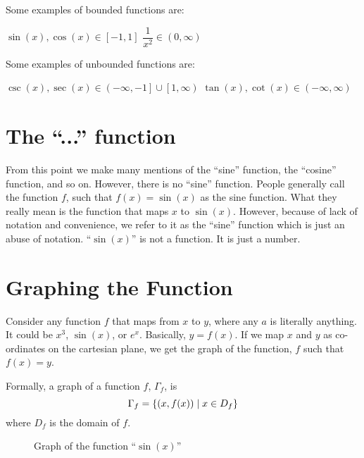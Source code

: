 \begin{example}
    Some examples of bounded functions are:
    \begin{enumerate}
        \ii \(\sin(x), \cos(x) \in \left[-1,1\right]\)
        \ii \(\dfrac{1}{x^2} \in \left(0,\infty\right)\)
    \end{enumerate}
\end{example}

\begin{example}
    Some examples of unbounded functions are:
    \begin{enumerate}
        \ii \(\csc(x), \sec(x) \in \left(-\infty, -1\right] \cup \left[1, \infty\right)\)
        \ii \(\tan(x), \cot(x) \in \left(-\infty, \infty\right)\)            
    \end{enumerate}
\end{example}

\section{The ``...'' function}
\label{sec: pedantic}
\irrev

From this point we make many mentions of the ``sine'' function, the ``cosine'' function,
and so on. However, there is no ``sine'' function. People generally call the function \(f\),
such that \(f(x) = \sin(x)\) as the sine function. What they really mean is the function that maps
\(x\) to \(\sin(x)\). However, because of lack of notation and convenience, we refer to it 
as the ``sine'' function which is just an abuse of notation. ``\(\sin(x)\)'' is not a function. It is
just a number.

\section{Graphing the Function}

Consider any function \(f\) that maps from \(x\) to \(y\), where any \(a\) is literally 
anything. It could be \(x^3\), \(\sin(x)\), or \(e^x\). Basically, \(y = f(x)\). If we map
\(x\) and \(y\) as co-ordinates on the cartesian plane, we get the graph of the function, \(f\)
such that \(f(x) = y\).

Formally, a graph of a function \(f\), \(\Gamma_f\), is
\[\Gamma_f = \left\{(x, f(x)) \mid x \in D_f\right\}\] 
where \(D_f\) is the domain of \(f\).

\begin{figure}[H]
    \centering
        \caption{Graph of the function ``{\color{red}\(\sin(x)\)}''}

\end{figure}

